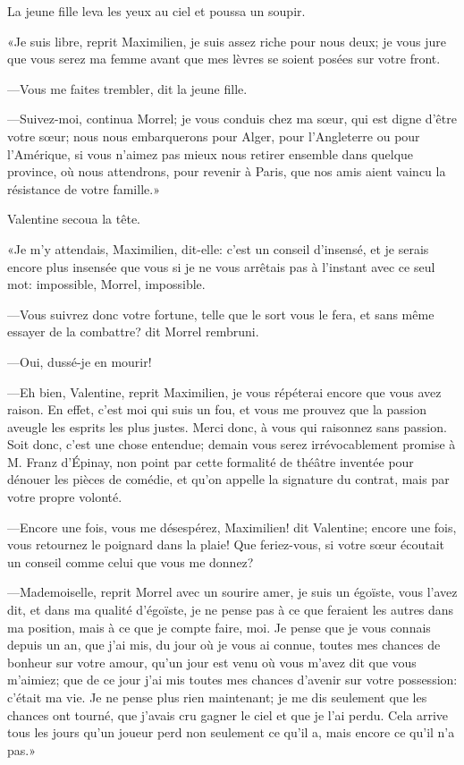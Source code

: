 La jeune fille leva les yeux au ciel et poussa un soupir. 

«Je suis libre, reprit Maximilien, je suis assez riche pour nous deux; je vous jure que vous serez ma femme avant que mes lèvres se soient posées sur votre front. 

—Vous me faites trembler, dit la jeune fille. 

—Suivez-moi, continua Morrel; je vous conduis chez ma sœur, qui est digne d'être votre sœur; nous nous embarquerons pour Alger, pour l'Angleterre ou pour l'Amérique, si vous n'aimez pas mieux nous retirer ensemble dans quelque province, où nous attendrons, pour revenir à Paris, que nos amis aient vaincu la résistance de votre famille.» 

Valentine secoua la tête. 

«Je m'y attendais, Maximilien, dit-elle: c'est un conseil d'insensé, et je serais encore plus insensée que vous si je ne vous arrêtais pas à l'instant avec ce seul mot: impossible, Morrel, impossible. 

—Vous suivrez donc votre fortune, telle que le sort vous le fera, et sans même essayer de la combattre? dit Morrel rembruni. 

—Oui, dussé-je en mourir! 

—Eh bien, Valentine, reprit Maximilien, je vous répéterai encore que vous avez raison. En effet, c'est moi qui suis un fou, et vous me prouvez que la passion aveugle les esprits les plus justes. Merci donc, à vous qui raisonnez sans passion. Soit donc, c'est une chose entendue; demain vous serez irrévocablement promise à M. Franz d'Épinay, non point par cette formalité de théâtre inventée pour dénouer les pièces de comédie, et qu'on appelle la signature du contrat, mais par votre propre volonté. 

—Encore une fois, vous me désespérez, Maximilien! dit Valentine; encore une fois, vous retournez le poignard dans la plaie! Que feriez-vous, si votre sœur écoutait un conseil comme celui que vous me donnez? 

—Mademoiselle, reprit Morrel avec un sourire amer, je suis un égoïste, vous l'avez dit, et dans ma qualité d'égoïste, je ne pense pas à ce que feraient les autres dans ma position, mais à ce que je compte faire, moi. Je pense que je vous connais depuis un an, que j'ai mis, du jour où je vous ai connue, toutes mes chances de bonheur sur votre amour, qu'un jour est venu où vous m'avez dit que vous m'aimiez; que de ce jour j'ai mis toutes mes chances d'avenir sur votre possession: c'était ma vie. Je ne pense plus rien maintenant; je me dis seulement que les chances ont tourné, que j'avais cru gagner le ciel et que je l'ai perdu. Cela arrive tous les jours qu'un joueur perd non seulement ce qu'il a, mais encore ce qu'il n'a pas.» 

